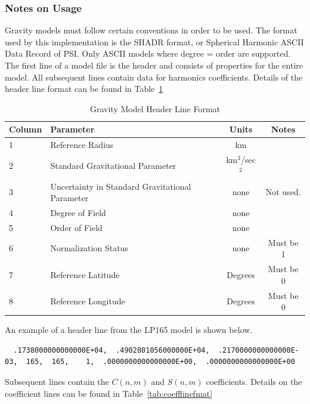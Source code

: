 \documentclass[Orbiter Technical Reference.tex]{subfiles}
\begin{document}
\subsubsection{Notes on Usage}
Gravity models must follow certain conventions in order to be used. The format used by this implementation is the SHADR format, or Spherical Harmonic ASCII Data Record of PSI\cite{shadr}. Only ASCII models where degree = order are supported.
The first line of a model file is the header and consists of properties for the entire model. All subsequent lines contain data for harmonics coefficients. Details of the header line format can be found in Table~\ref{tab:headlinefmat}
\begin{table}[h]
\begin{tabular}{llcc}
Column	&Parameter                        				&Units      			& Notes     \\\hline
1		&Reference Radius                 				&km         			&           \\
2		&Standard Gravitational Parameter 			&km$^3$/sec$^2$ 	&           \\
3		&Uncertainty in Standard Gravitational Parameter	&none           		& Not used. \\
4		&Degree of Field						&none           		&		\\
5		&Order of Field						&none				&		\\
6		&Normalization Status					&none				&Must be 1	\\
7		&Reference Latitude					&Degrees			&Must be 0	\\
8		&Reference Longitude					&Degrees			&Must be 0	
\end{tabular}
\caption{Gravity Model Header Line Format}
\label{tab:headlinefmat}
\end{table}


An example of a header line from the LP165 model is shown below.
\begin{tiny}
\begin{verbatim}
  .1738000000000000E+04,  .4902801056000000E+04,  .2170000000000000E-03,  165,  165,    1,  .0000000000000000E+00,  .0000000000000000E+00   
\end{verbatim}
\end{tiny}

Subsequent lines contain the $C(n,m)$ and $S(n,m)$ coefficients. Details on the coefficient lines can be found in Table~\ref{tab:coefflinefmat}
\end{document}
